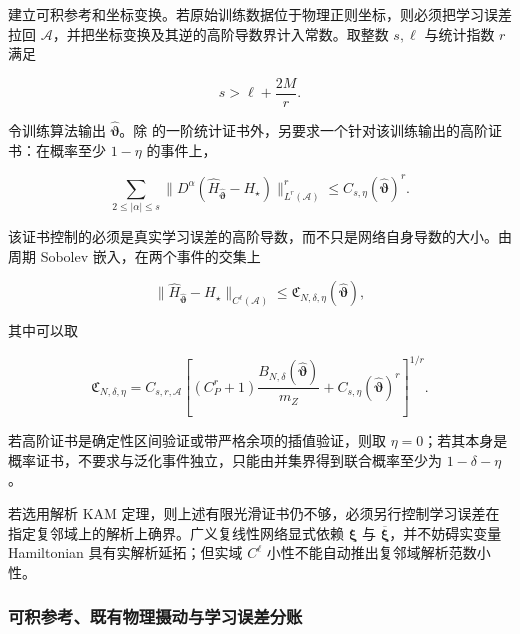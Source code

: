 建立可积参考和坐标变换。若原始训练数据位于物理正则坐标，则必须把学习误差拉回 \(\mathcal{A}\)，并把坐标变换及其逆的高阶导数界计入常数。取整数 \(s,\ell\) 与统计指数 \(r\) 满足

\begin{equation}
\label{eq:chnn-4-51}
s > \ell + \frac{2M}{r}.
\end{equation}

令训练算法输出 \(\widehat{\bm{\vartheta}}\)。除 的一阶统计证书外，另要求一个针对该训练输出的高阶证书：在概率至少 \(1 - \eta\) 的事件上，

\begin{equation}
\label{eq:chnn-4-52}
\sum_{2 \leq |\alpha| \leq s}^{}\left. \parallel D^{\alpha}\left( {\widehat{H}}_{\widehat{\bm{\vartheta}}} - H_{\star} \right) \right.\parallel_{L^{r}\left( \mathcal{A} \right)}^{r} \leq C_{s,\eta}\left( \widehat{\bm{\vartheta}} \right)^{r}.
\end{equation}

该证书控制的必须是真实学习误差的高阶导数，而不只是网络自身导数的大小。由周期 Sobolev 嵌入，在两个事件的交集上

\begin{equation}
\label{eq:chnn-4-53}
\left. \parallel{\widehat{H}}_{\widehat{\bm{\vartheta}}} - H_{\star} \right.\parallel_{C^{\ell}\left( \mathcal{A} \right)} \leq \mathfrak{C}_{N,\delta,\eta}\left( \widehat{\bm{\vartheta}} \right),
\end{equation}

其中可以取

\begin{equation}
\label{eq:chnn-4-54}
\mathfrak{C}_{N,\delta,\eta} = C_{s,r,\mathcal{A}}\left\lbrack \left( C_{P}^{r} + 1 \right)\frac{B_{N,\delta}\left( \widehat{\bm{\vartheta}} \right)}{m_{Z}} + C_{s,\eta}\left( \widehat{\bm{\vartheta}} \right)^{r} \right\rbrack^{1/r}.
\end{equation}

若高阶证书是确定性区间验证或带严格余项的插值验证，则取 \(\eta = 0\)；若其本身是概率证书，不要求与泛化事件独立，只能由并集界得到联合概率至少为 \(1 - \delta - \eta\)。

若选用解析 KAM 定理，则上述有限光滑证书仍不够，必须另行控制学习误差在指定复邻域上的解析上确界。广义复线性网络显式依赖 \(\bm{\xi}\) 与 \(\overline{\bm{\xi}}\)，并不妨碍实变量 Hamiltonian 具有实解析延拓；但实域 \(C^{\ell}\) 小性不能自动推出复邻域解析范数小性。

\subsubsection{可积参考、既有物理摄动与学习误差分账}\label{sec:chnn-4-6-6}


